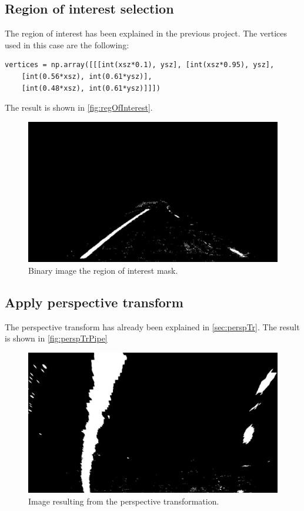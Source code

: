 \documentclass{article}
\begin{document}
\subsection{Region of interest selection}
The region of interest has been explained in the previous project. The vertices used in this case are the following:
\begin{lstlisting}
vertices = np.array([[[int(xsz*0.1), ysz], [int(xsz*0.95), ysz], 
    [int(0.56*xsz), int(0.61*ysz)],
    [int(0.48*xsz), int(0.61*ysz)]]])
\end{lstlisting}	
The result is shown in \autoref{fig:regOfInterest}.
\begin{figure}
\centering
\includegraphics[scale=0.25]{output_images/test1/7_region_of_interest}
\caption{Binary image the region of interest mask.}
\label{fig:regOfInterest}
\end{figure}

\subsection{Apply perspective transform}
The perspective transform has already been explained in \autoref{sec:perspTr}. The result is shown in \autoref{fig:perspTrPipe}
\begin{figure}
\centering
\includegraphics[scale=0.25]{output_images/test1/8_persp_transf}
\caption{Image resulting from the perspective transformation.}
\label{fig:perspTrPipe}
\end{figure}
\end{document}

